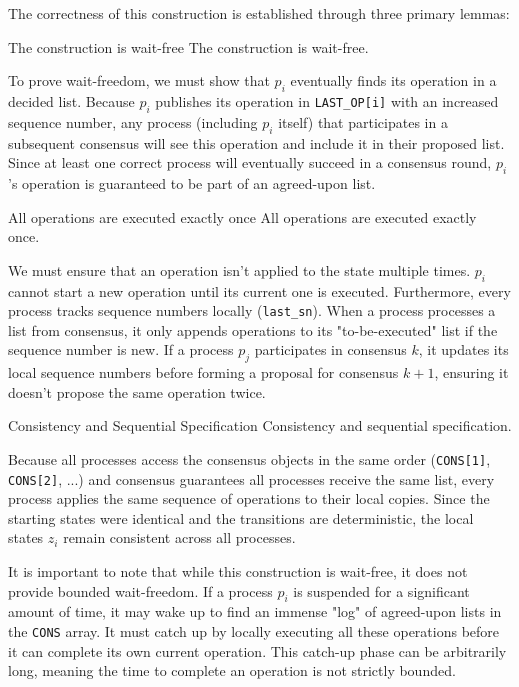The correctness of this construction is established through three primary lemmas:

\begin{Lemma}{The construction is wait-free}{}
The construction is wait-free.
\begin{demonstration}
To prove wait-freedom, we must show that $p_i$ eventually finds its operation in a decided list. Because $p_i$ publishes its operation in \texttt{LAST\_OP[i]} with an increased sequence number, any process (including $p_i$ itself) that participates in a subsequent consensus will see this operation and include it in their proposed list. Since at least one correct process will eventually succeed in a consensus round, $p_i$'s operation is guaranteed to be part of an agreed-upon list.  
\end{demonstration}
\end{Lemma}

\begin{Lemma}{All operations are executed exactly once}{}
All operations are executed exactly once.
\begin{demonstration}
We must ensure that an operation isn't applied to the state multiple times. $p_i$ cannot start a new operation until its current one is executed. Furthermore, every process tracks sequence numbers locally (\texttt{last\_sn}). When a process processes a list from consensus, it only appends operations to its "to-be-executed" list if the sequence number is new. If a process $p_j$ participates in consensus $k$, it updates its local sequence numbers before forming a proposal for consensus $k+1$, ensuring it doesn't propose the same operation twice.
\end{demonstration}
\end{Lemma}

\begin{Lemma}{Consistency and Sequential Specification}{}
Consistency and sequential specification.
\begin{demonstration}
Because all processes access the consensus objects in the same order (\texttt{CONS[1]}, \texttt{CONS[2]}, ...) and consensus guarantees all processes receive the same list, every process applies the same sequence of operations to their local copies. Since the starting states were identical and the transitions are deterministic, the local states $z_i$ remain consistent across all processes.
\end{demonstration}
\end{Lemma}

It is important to note that while this construction is wait-free, it does not provide bounded wait-freedom. If a process $p_i$ is suspended for a significant amount of time, it may wake up to find an immense "log" of agreed-upon lists in the \texttt{CONS} array. It must catch up by locally executing all these operations before it can complete its own current operation. This catch-up phase can be arbitrarily long, meaning the time to complete an operation is not strictly bounded.

